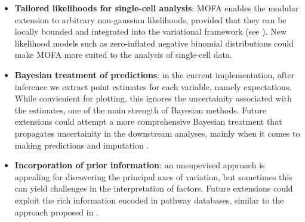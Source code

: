 \begin{itemize}
	\item \textbf{Tailored likelihoods for single-cell analysis}: MOFA enables the modular extension to arbitrary non-gaussian likelihoods, provided that they can be locally bounded and integrated into the variational framework (see ). New likelihood models such as zero-inflated negative binomial distributions \cite{Risso2018} could make MOFA more suited to the analysis of single-cell data.

	\item \textbf{Bayesian treatment of predictions}: in the current implementation, after inference we extract point estimates for each variable, namely expectations. While convienient for plotting, this ignores the uncertainity associated with the estimates, one of the main strength of Bayesian methods. Future extensions could attempt a more comprehensive Bayesian treatment that propagates uncertainity in the downstream analyses, mainly when it comes to making predictions and imputation \cite{Gelman2013}.

	\item \textbf{Incorporation of prior information}: an unsupevised approach is appealing for discovering the principal axes of variation, but sometimes this can yield challenges in the interpretation of factors. Future extensions could exploit the rich information encoded in pathway databases, similar to the approach proposed in \cite{Buettner2017}.

\end{itemize}


